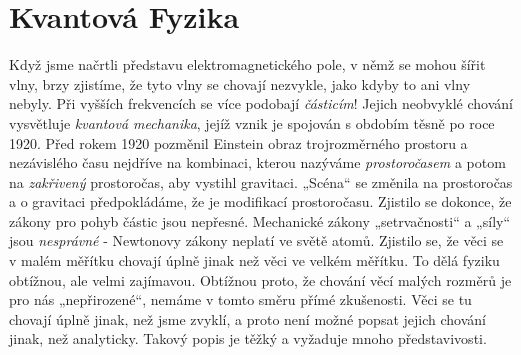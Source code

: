   \section{Kvantová Fyzika}\label{fyz:IchapIsecV}
    Když jsme načrtli představu elektromagnetického pole, v němž se mohou šířit vlny, brzy 
    zjistíme, že tyto vlny se chovají nezvykle, jako kdyby to ani vlny nebyly. Při vyšších 
    frekvencích se více podobají \emph{částicím}! Jejich neobvyklé chování vysvětluje 
    \emph{kvantová mechanika}, jejíž vznik je spojován s obdobím těsně po roce 1920. Před rokem 
    1920 pozměnil Einstein obraz trojrozměrného prostoru a nezávislého času nejdříve na kombinaci, 
    kterou nazýváme \emph{prostoročasem} a potom na \emph{zakřivený} prostoročas, aby vystihl 
    gravitaci. „Scéna“ se změnila na prostoročas a o gravitaci předpokládáme, že je modifikací 
    prostoročasu. Zjistilo se dokonce, že zákony pro pohyb částic jsou nepřesné. Mechanické zákony 
    „setrvačnosti“ a „síly“ jsou \emph{nesprávné} - Newtonovy zákony neplatí ve světě atomů. 
    Zjistilo se, že věci se v malém měřítku chovají úplně jinak než věci ve velkém měřítku. To dělá 
    fyziku obtížnou, ale velmi zajímavou. Obtížnou proto, že chování věcí malých rozměrů je pro nás 
    „nepřirozené“, nemáme v tomto směru přímé zkušenosti. Věci se tu chovají úplně jinak, než jsme 
    zvyklí, a proto není možné popsat jejich chování jinak, než analyticky. Takový popis je těžký a 
    vyžaduje mnoho představivosti.
    
